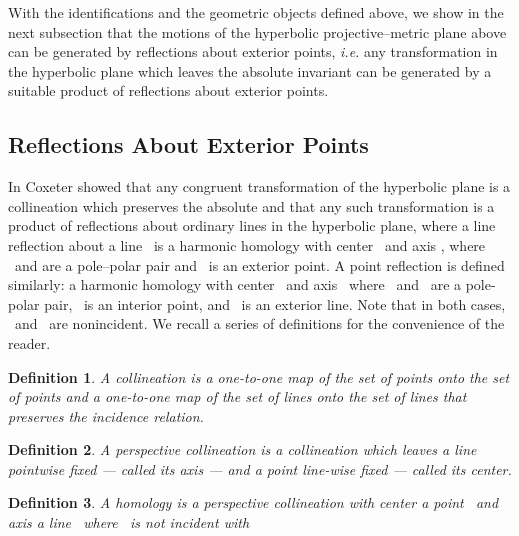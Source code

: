 \documentclass[a4paper,twoside,12pt]{article}
\newtheorem{definition}{Definition}[section]
\begin{document}
     With the identifications and the geometric objects defined above,
we show in the next subsection that the motions of the hyperbolic
projective--metric plane above can be generated by reflections about
exterior points, {\it i.e.} any transformation in the hyperbolic plane
which leaves the absolute invariant can be generated by a suitable
product of reflections about exterior points.

\subsection{Reflections About Exterior Points}

     In \cite{Cox3} Coxeter showed that any congruent
transformation of the hyperbolic plane is a collineation which preserves the
absolute and that any such transformation is a product of reflections about
ordinary lines in the hyperbolic plane, where a line reflection about a line 
\coordHE{}\ is a harmonic homology with center \coordHE{}\ and axis \coordHE{}, where \coordHE{}\ and \coordHE{}
are a pole--polar pair and \coordHE{}\ is an exterior point. A point reflection is
defined similarly: a harmonic homology with center \coordHE{}\ and axis \coordHE{}\ where 
\coordHE{}\ and \coordHE{}\ are a pole-polar pair, \coordHE{}\ is an interior point, and \coordHE{}\ is
an exterior line. Note that in both cases, \coordHE{}\ and \coordHE{}\ are nonincident.
We recall a series of definitions for the convenience of the reader.

\begin{definition} A collineation is a one-to-one map of the set of
points onto the set of points and a one-to-one map of the set of lines onto
the set of lines that preserves the incidence relation.
\end{definition}

\begin{definition} A perspective collineation is a collineation which
leaves a line pointwise fixed --- called its axis --- and a point 
line-wise fixed --- called its center.
\end{definition}

\begin{definition} A homology is a perspective collineation with
center a point \coordHE{}\ and axis a line \coordHE{}\ where \coordHE{}\ is not incident with \coordHE{}
\end{definition}
\end{document}
